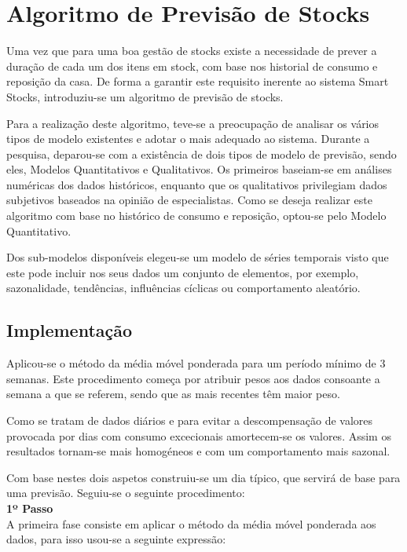 \section{Algoritmo de Previsão de Stocks}\label{sec33}

Uma vez que para uma boa gestão de stocks existe a necessidade de prever a duração de cada um dos itens em stock, com base nos historial de consumo e reposição da casa. De forma a garantir este requisito inerente ao sistema Smart Stocks, introduziu-se um algoritmo de previsão de stocks.

Para a realização deste algoritmo, teve-se a preocupação de analisar os vários tipos de modelo existentes e adotar o mais adequado ao sistema. Durante a pesquisa, deparou-se com a existência de dois tipos de modelo de previsão, sendo eles, Modelos Quantitativos e Qualitativos. Os primeiros baseiam-se em análises numéricas dos dados históricos, enquanto que os qualitativos privilegiam dados subjetivos baseados na opinião de especialistas. Como se deseja realizar este algoritmo com base no histórico de consumo e reposição, optou-se pelo Modelo Quantitativo. 

Dos sub-modelos disponíveis elegeu-se um modelo de séries temporais visto que este pode incluir nos seus dados um conjunto de elementos, por exemplo, sazonalidade, tendências, influências cíclicas ou comportamento aleatório.




%
%
\subsection{Implementação}\label{subsec331}

Aplicou-se o método da média móvel ponderada para um período mínimo de 3 semanas. Este procedimento começa por atribuir pesos aos dados consoante a semana a que se referem, sendo que as mais recentes têm maior peso.

Como se tratam de dados diários e para evitar a descompensação de valores provocada por dias com consumo excecionais amortecem-se  os valores. Assim os resultados tornam-se mais homogéneos e com um comportamento mais sazonal.   

Com base nestes dois aspetos construiu-se um dia típico, que servirá de base para uma previsão. Seguiu-se o seguinte procedimento:\\

\textbf{1º Passo}\\
A primeira fase consiste em aplicar o método da média móvel ponderada aos dados, para isso usou-se a seguinte expressão:

